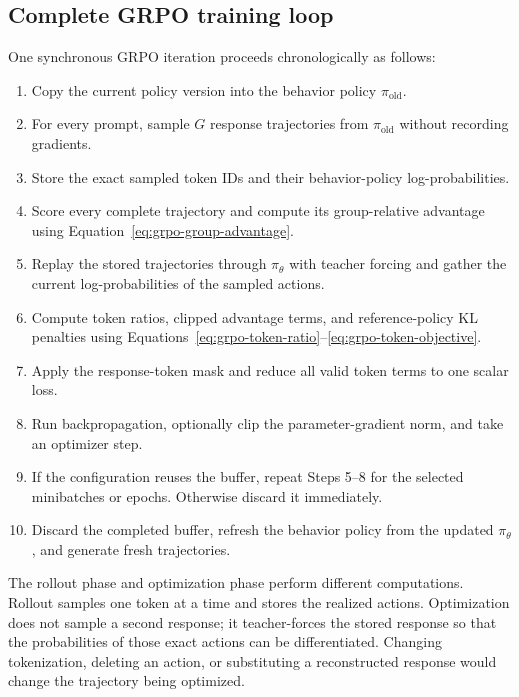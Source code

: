 \subsection{Complete GRPO training loop}

One synchronous GRPO iteration proceeds chronologically as follows:
\begin{enumerate}
  \item Copy the current policy version into the behavior policy
        $\pi_{\mathrm{old}}$.
  \item For every prompt, sample $G$ response trajectories from
        $\pi_{\mathrm{old}}$ without recording gradients.
  \item Store the exact sampled token IDs and their behavior-policy log-probabilities.
  \item Score every complete trajectory and compute its group-relative advantage using
        Equation~\ref{eq:grpo-group-advantage}.
  \item Replay the stored trajectories through $\pi_\theta$ with teacher forcing and
        gather the current log-probabilities of the sampled actions.
  \item Compute token ratios, clipped advantage terms, and reference-policy KL penalties
        using Equations~\ref{eq:grpo-token-ratio}--\ref{eq:grpo-token-objective}.
  \item Apply the response-token mask and reduce all valid token terms to one scalar loss.
  \item Run backpropagation, optionally clip the parameter-gradient norm, and take an
        optimizer step.
  \item If the configuration reuses the buffer, repeat Steps 5--8 for the selected
        minibatches or epochs. Otherwise discard it immediately.
  \item Discard the completed buffer, refresh the behavior policy from the updated
        $\pi_\theta$, and generate fresh trajectories.
\end{enumerate}

The rollout phase and optimization phase perform different computations. Rollout samples
one token at a time and stores the realized actions. Optimization does not sample a second
response; it teacher-forces the stored response so that the probabilities of those exact
actions can be differentiated. Changing tokenization, deleting an action, or substituting
a reconstructed response would change the trajectory being optimized.
